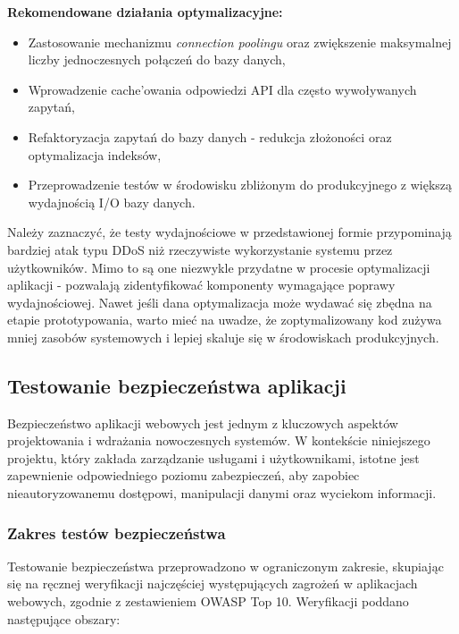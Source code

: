 \textbf{Rekomendowane działania optymalizacyjne:}
\begin{itemize}
    \item Zastosowanie mechanizmu \textit{connection poolingu} oraz zwiększenie maksymalnej liczby jednoczesnych połączeń do bazy danych,
    \item Wprowadzenie cache'owania odpowiedzi API dla często wywoływanych zapytań,
    \item Refaktoryzacja zapytań do bazy danych - redukcja złożoności oraz optymalizacja indeksów,
    \item Przeprowadzenie testów w środowisku zbliżonym do produkcyjnego z większą wydajnością I/O bazy danych.
\end{itemize}

\noindent
Należy zaznaczyć, że testy wydajnościowe w przedstawionej formie przypominają bardziej atak typu DDoS niż rzeczywiste wykorzystanie systemu przez użytkowników. Mimo to są one niezwykle przydatne w procesie optymalizacji aplikacji - pozwalają zidentyfikować komponenty wymagające poprawy wydajnościowej. Nawet jeśli dana optymalizacja może wydawać się zbędna na etapie prototypowania, warto mieć na uwadze, że zoptymalizowany kod zużywa mniej zasobów systemowych i lepiej skaluje się w środowiskach produkcyjnych.

\subsection{Testowanie bezpieczeństwa aplikacji}

Bezpieczeństwo aplikacji webowych jest jednym z kluczowych aspektów projektowania i wdrażania nowoczesnych systemów. W kontekście niniejszego projektu, który zakłada zarządzanie usługami i użytkownikami, istotne jest zapewnienie odpowiedniego poziomu zabezpieczeń, aby zapobiec nieautoryzowanemu dostępowi, manipulacji danymi oraz wyciekom informacji.

\subsubsection{Zakres testów bezpieczeństwa}

Testowanie bezpieczeństwa przeprowadzono w ograniczonym zakresie, skupiając się na ręcznej weryfikacji najczęściej występujących zagrożeń w aplikacjach webowych, zgodnie z zestawieniem OWASP Top 10. Weryfikacji poddano następujące obszary:

